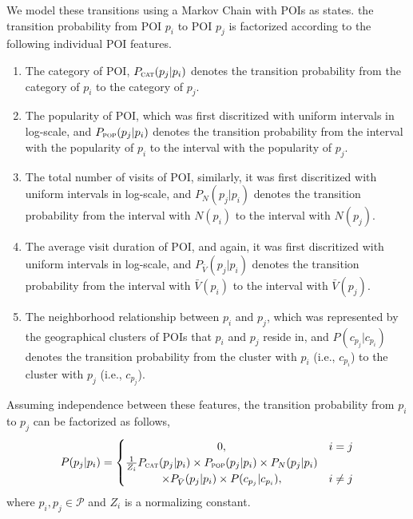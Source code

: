 We model these transitions using a Markov Chain with POIs as states.
the transition probability from POI $p_i$ to POI $p_j$ is factorized according to 
the following individual POI features.
\begin{enumerate}
\item The category of POI, $P_{\textsc{cat}}(p_j | p_i)$
      denotes the transition probability from the category of $p_i$ to the category of $p_j$.
\item The popularity of POI, which was first discritized with uniform intervals in log-scale,
      and $P_{\textsc{pop}}(p_j | p_i)$ denotes the transition probability from the interval with the popularity of
      $p_i$ to the interval with the popularity of $p_j$.
\item The total number of visits of POI, similarly, it was first discritized with uniform intervals in log-scale,
      and $P_N(p_j | p_i)$ denotes the transition probability from the interval with $N(p_i)$
      to the interval with $N(p_j)$.
\item The average visit duration of POI, and again, it was first discritized with uniform intervals in log-scale,
      and $P_{\bar{V}}(p_j | p_i)$ denotes the transition probability from the interval with $\bar{V}(p_i)$
      to the interval with $\bar{V}(p_j)$.
\item The neighborhood relationship between $p_i$ and $p_j$,
      which was represented by the geographical clusters of POIs that $p_i$ and $p_j$ reside in,
      and $P(c_{p_j} | c_{p_i})$ denotes the transition probability from the cluster with
      $p_i$ (i.e., $c_{p_i}$) to the cluster with $p_j$ (i.e., $c_{p_j}$).
\end{enumerate}

Assuming independence between these features,
the transition probability from $p_i$ to $p_j$ can be factorized as follows,
\begin{displaymath}
    P(p_j | p_i) =
    \begin{cases}
    \hfill 0, \hfill & i = j \\
    \hfill \frac{1}{Z_i} P_{\textsc{cat}}(p_j | p_i) \times P_{\textsc{pop}}(p_j | p_i) \times P_N(p_j | p_i) \\
    \hfill \times P_{\bar{V}}(p_j | p_i) \times P(c_{p_j} | c_{p_i}), \hfill & i \ne j
    \end{cases}
\end{displaymath}
where $p_i, p_j \in \mathcal{P}$ and $Z_i$ is a normalizing constant.

